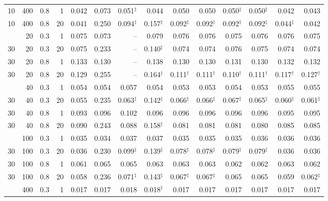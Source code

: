 \begin{tabular}{@{}rrrrrrrrrrrrrr@{}}
10 & 400 & 0.8 & 1 & 0.042 & 0.073 & 0.051$^{\ddagger}$ & 0.044 & 0.050 & 0.050 & 0.050$^{\ddagger}$ & 0.050$^{\ddagger}$ & 0.042 & 0.043 \\
10 & 400 & 0.8 & 20 & 0.041 & 0.250 & 0.094$^{\ddagger}$ & 0.157$^{\ddagger}$ & 0.092$^{\ddagger}$ & 0.092$^{\ddagger}$ & 0.092$^{\ddagger}$ & 0.092$^{\ddagger}$ & 0.044$^{\ddagger}$ & 0.042 \\
\addlinespace[1pt]
30 & 20 & 0.3 & 1 & 0.075 & 0.073 & -- & 0.079 & 0.076 & 0.076 & 0.075 & 0.076 & 0.076 & 0.075 \\
30 & 20 & 0.3 & 20 & 0.075 & 0.233 & -- & 0.140$^{\ddagger}$ & 0.074 & 0.074 & 0.076 & 0.075 & 0.074 & 0.074 \\
30 & 20 & 0.8 & 1 & 0.133 & 0.130 & -- & 0.138 & 0.130 & 0.130 & 0.131 & 0.130 & 0.132 & 0.132 \\
30 & 20 & 0.8 & 20 & 0.129 & 0.255 & -- & 0.164$^{\ddagger}$ & 0.111$^{\dagger}$ & 0.111$^{\dagger}$ & 0.110$^{\dagger}$ & 0.111$^{\dagger}$ & 0.117$^{\dagger}$ & 0.127$^{\dagger}$ \\
\addlinespace[1pt]
30 & 40 & 0.3 & 1 & 0.054 & 0.054 & 0.057 & 0.054 & 0.053 & 0.053 & 0.054 & 0.053 & 0.055 & 0.055 \\
30 & 40 & 0.3 & 20 & 0.055 & 0.235 & 0.063$^{\ddagger}$ & 0.142$^{\ddagger}$ & 0.066$^{\ddagger}$ & 0.066$^{\ddagger}$ & 0.067$^{\ddagger}$ & 0.065$^{\ddagger}$ & 0.060$^{\ddagger}$ & 0.061$^{\ddagger}$ \\
30 & 40 & 0.8 & 1 & 0.093 & 0.096 & 0.102 & 0.096 & 0.096 & 0.096 & 0.096 & 0.096 & 0.095 & 0.095 \\
30 & 40 & 0.8 & 20 & 0.090 & 0.243 & 0.088 & 0.158$^{\ddagger}$ & 0.081 & 0.081 & 0.081 & 0.080 & 0.085 & 0.085 \\
\addlinespace[1pt]
30 & 100 & 0.3 & 1 & 0.035 & 0.034 & 0.037 & 0.037 & 0.035 & 0.035 & 0.035 & 0.036 & 0.036 & 0.036 \\
30 & 100 & 0.3 & 20 & 0.036 & 0.230 & 0.099$^{\ddagger}$ & 0.139$^{\ddagger}$ & 0.078$^{\ddagger}$ & 0.078$^{\ddagger}$ & 0.079$^{\ddagger}$ & 0.079$^{\ddagger}$ & 0.036 & 0.036 \\
30 & 100 & 0.8 & 1 & 0.061 & 0.065 & 0.065 & 0.063 & 0.063 & 0.063 & 0.062 & 0.062 & 0.063 & 0.062 \\
30 & 100 & 0.8 & 20 & 0.058 & 0.236 & 0.071$^{\ddagger}$ & 0.143$^{\ddagger}$ & 0.067$^{\ddagger}$ & 0.067$^{\ddagger}$ & 0.065 & 0.065 & 0.059 & 0.062$^{\ddagger}$ \\
\addlinespace[1pt]
30 & 400 & 0.3 & 1 & 0.017 & 0.017 & 0.018 & 0.018$^{\ddagger}$ & 0.017 & 0.017 & 0.017 & 0.017 & 0.017 & 0.017 \\

\end{tabular}
